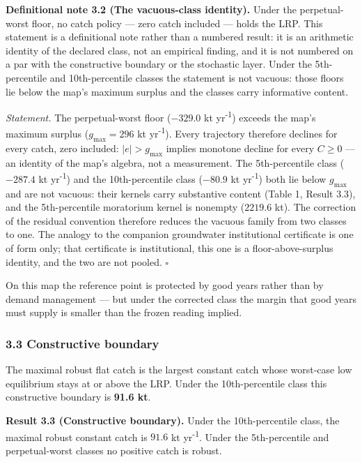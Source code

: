 \documentclass[11pt]{article}
\begin{document}
\textbf{Definitional note 3.2 (The vacuous-class identity).} Under the
perpetual-worst floor, no catch policy --- zero catch included --- holds
the LRP. This statement is a definitional note rather than a numbered
result: it is an arithmetic identity of the declared class, not an
empirical finding, and it is not numbered on a par with the constructive
boundary or the stochastic layer. Under the 5th-percentile and
10th-percentile classes the statement is not vacuous: those floors lie
below the map's maximum surplus and the classes carry informative
content.

\emph{Statement.} The perpetual-worst floor (\(-329.0\) kt yr\textsuperscript{-1}) exceeds
the map's maximum surplus (\(g_{\max} = 296\) kt yr\textsuperscript{-1}). Every trajectory
therefore declines for every catch, zero included: \(|e| > g_{\max}\)
implies monotone decline for every \(C \ge 0\) --- an identity of the
map's algebra, not a measurement. The 5th-percentile class (\(-287.4\)
kt yr\textsuperscript{-1}) and the 10th-percentile class (\(-80.9\) kt yr\textsuperscript{-1}) both lie
below \(g_{\max}\) and are not vacuous: their kernels carry substantive
content (Table 1, Result 3.3), and the 5th-percentile moratorium kernel
is nonempty (\(2219.6\) kt). The correction of the residual convention
therefore reduces the vacuous family from two classes to one. The
analogy to the companion groundwater institutional certificate is one of
form only; that certificate is institutional, this one is a
floor-above-surplus identity, and the two are not pooled. \ensuremath{\square}

On this map the reference point is protected by good years rather than
by demand management --- but under the corrected class the margin that
good years must supply is smaller than the frozen reading implied.

\subsubsection{3.3 Constructive boundary}\label{constructive-boundary}

The maximal robust flat catch is the largest constant catch whose
worst-case low equilibrium stays at or above the LRP. Under the
10th-percentile class this constructive boundary is \textbf{91.6 kt}.

\textbf{Result 3.3 (Constructive boundary).} Under the 10th-percentile
class, the maximal robust constant catch is \(91.6\) kt yr\textsuperscript{-1}. Under the
5th-percentile and perpetual-worst classes no positive catch is robust.
\end{document}
